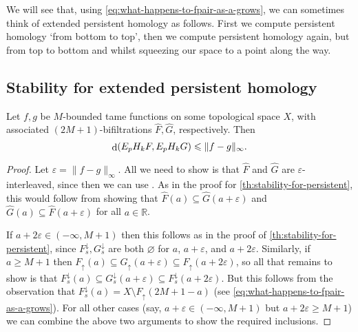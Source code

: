 \documentclass[12pt]{article}
\numberwithin{equation}{subsection}
\numberwithin{theorem}{subsection}
\numberwithin{lemma}{subsection}
\numberwithin{corollary}{subsection}
\numberwithin{definition}{subsection}
\numberwithin{example}{subsection}
\numberwithin{note}{subsection}
\newcommand{\rr}{\mathbb{R}}
\DeclareMathOperator{\dist}{d}
\newcommand{\vare}{\varepsilon}
\newcommand{\Fup}{F_\uparrow}
\newcommand{\Fdown}{F^\downarrow_s}
\begin{document}
        We will see that, using \cref{eq:what-happens-to-fpair-as-a-grows}, we can sometimes think of extended persistent homology as follows.
        First we compute persistent homology `from bottom to top', then we compute persistent homology again, but from top to bottom and whilst squeezing our space to a point along the way.

        \subsection{Stability for extended persistent homology} %
        \label{sub:stability_for_extended_persistence_homology}

            \begin{theorem}\label{th:stability-for-extended-persistent}
                Let $f,g$ be $M$-bounded tame functions on some topological space $X$, with associated \mbox{$(2M+1)$-bifiltrations} $\widehat{F},\widehat{G}$, respectively.
                Then
                \begin{equation*}
                    \dist(E_pH_kF,E_pH_kG)\leqslant\|f-g\|_\infty.\qedhere
                \end{equation*}
            \end{theorem}

            \begin{proof}
                Let $\vare=\|f-g\|_\infty$.
                All we need to show is that $\widehat{F}$ and $\widehat{G}$ are $\vare$-interleaved, since then we can use \cite[Proposition~3.6]{Bubenik:dn}.
                As in the proof for \cref{th:stability-for-persistent}, this would follow from showing that $\widehat{F}(a)\subseteq\widehat{G}(a+\vare)$ and $\widehat{G}(a)\subseteq\widehat{F}(a+\vare)$ for all $a\in\rr$.

                If $a+2\vare\in(-\infty,M+1)$ then this follows as in the proof of \cref{th:stability-for-persistent}, since $\Fdown,G^\downarrow_s$ are both $\varnothing$ for $a$, $a+\vare$, and $a+2\vare$.
                Similarly, if $a\geqslant M+1$ then $\Fup(a)\subseteq G_\uparrow(a+\vare)\subseteq \Fup(a+2\vare)$, so all that remains to show is that $\Fdown(a)\subseteq G^\downarrow_s(a+\vare)\subseteq\Fdown(a+2\vare)$.
                But this follows from the observation that $\Fdown(a)=X\setminus\Fup(2M+1-a)$ (see \cref{eq:what-happens-to-fpair-as-a-grows}).
                For all other cases (say, $a+\vare\in(-\infty,M+1)$ but $a+2\vare\geqslant M+1$) we can combine the above two arguments to show the required inclusions.
            \end{proof}
\end{document}
